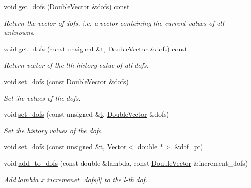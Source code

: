 \begin{DoxyCompactItemize}
void \hyperlink{classoomph_1_1Problem_ae2ef66732d76053dba15001818c0605c}{get\+\_\+dofs} (\hyperlink{classoomph_1_1DoubleVector}{Double\+Vector} \&dofs) const
\begin{DoxyCompactList}\small\item\em Return the vector of dofs, i.\+e. a vector containing the current values of all unknowns. \end{DoxyCompactList}\item 
void \hyperlink{classoomph_1_1Problem_abb56c404b0dd6df75bcadab797d9a24e}{get\+\_\+dofs} (const unsigned \&\hyperlink{cfortran_8h_af6f0bd3dc13317f895c91323c25c2b8f}{t}, \hyperlink{classoomph_1_1DoubleVector}{Double\+Vector} \&dofs) const
\begin{DoxyCompactList}\small\item\em Return vector of the t\textquotesingle{}th history value of all dofs. \end{DoxyCompactList}\item 
void \hyperlink{classoomph_1_1Problem_ab51480d18550c107c9f13629102f6b08}{set\+\_\+dofs} (const \hyperlink{classoomph_1_1DoubleVector}{Double\+Vector} \&dofs)
\begin{DoxyCompactList}\small\item\em Set the values of the dofs. \end{DoxyCompactList}\item 
void \hyperlink{classoomph_1_1Problem_a62d7dbbf49388e6383e3b93e50351e89}{set\+\_\+dofs} (const unsigned \&\hyperlink{cfortran_8h_af6f0bd3dc13317f895c91323c25c2b8f}{t}, \hyperlink{classoomph_1_1DoubleVector}{Double\+Vector} \&dofs)
\begin{DoxyCompactList}\small\item\em Set the history values of the dofs. \end{DoxyCompactList}\item 
void \hyperlink{classoomph_1_1Problem_ac99c82660395bd5f63888e21f9c2002f}{set\+\_\+dofs} (const unsigned \&\hyperlink{cfortran_8h_af6f0bd3dc13317f895c91323c25c2b8f}{t}, \hyperlink{classoomph_1_1Vector}{Vector}$<$ double $\ast$$>$ \&\hyperlink{classoomph_1_1Problem_a9b6926d906bedf6adfeed6872d3fd3a8}{dof\+\_\+pt})
\item 
void \hyperlink{classoomph_1_1Problem_a352210408b3eed3e7a834b8b9a33a99a}{add\+\_\+to\+\_\+dofs} (const double \&lambda, const \hyperlink{classoomph_1_1DoubleVector}{Double\+Vector} \&increment\+\_\+dofs)
\begin{DoxyCompactList}\small\item\em Add lambda x incremenet\+\_\+dofs\mbox{[}l\mbox{]} to the l-\/th dof. \end{DoxyCompactList}\item 
$$
\end{DoxyCompactItemize}
